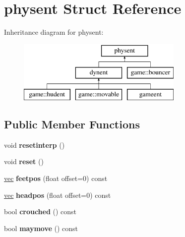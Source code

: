 \hypertarget{structphysent}{}\section{physent Struct Reference}
\label{structphysent}
Inheritance diagram for physent\+:\begin{figure}[H]
\begin{center}
\leavevmode
\includegraphics[height=3.000000cm]{structphysent}
\end{center}
\end{figure}
\subsection*{Public Member Functions}
\begin{DoxyCompactItemize}
\item 
\mbox{\label{structphysent_ae7f144b4b800e0f65380a5b9100fa873}} 
void {\bfseries resetinterp} ()
\item 
\mbox{\label{structphysent_a15f62f17bdc375ca4e767e6a93ead96d}} 
void {\bfseries reset} ()
\item 
\mbox{\label{structphysent_ab4ce83640adb6e1c61172f0071ba19a2}} 
\hyperlink{structvec}{vec} {\bfseries feetpos} (float offset=0) const
\item 
\mbox{\label{structphysent_a4aa5bdcd5aa009bd8ec1c07a77aa3b2b}} 
\hyperlink{structvec}{vec} {\bfseries headpos} (float offset=0) const
\item 
\mbox{\label{structphysent_ad4a9c759de332ce153e53cdab517d84c}} 
bool {\bfseries crouched} () const
\item 
\mbox{\label{structphysent_a596616d4fd2ba0db4d321b8a23f4d2b4}} 
bool {\bfseries maymove} () const
\end{DoxyCompactItemize}
